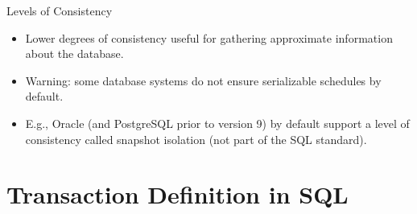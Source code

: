 \documentclass[aspectratio=169]{beamer}
\begin{document}
\begin{frame}{Levels of Consistency}
    \begin{itemize}
        \item Lower degrees of consistency useful for gathering approximate information about the database.
        \item Warning: some database systems do not ensure serializable schedules by default.
        \item E.g., Oracle (and PostgreSQL prior to version 9) by default support a level of consistency called snapshot isolation (not part of the SQL standard).
    \end{itemize}
\end{frame}

\section{Transaction Definition in SQL}

\end{document}
